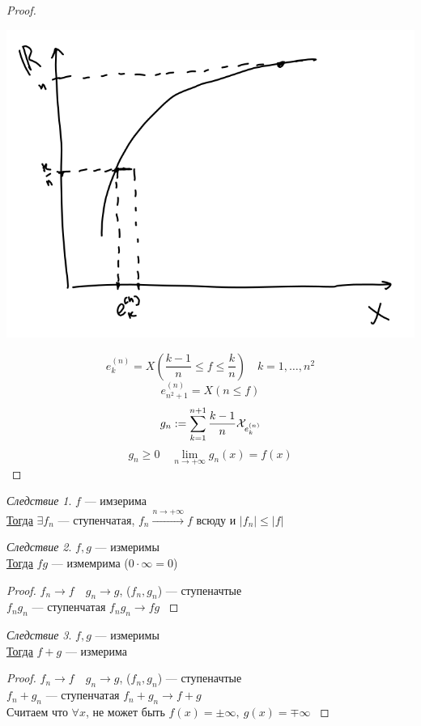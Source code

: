 \documentclass[english]{article}
\theoremstyle{plain}
\theoremstyle{remark}
\newtheorem{corollary}{Следствие}[theorem]
\theoremstyle{definition}
\begin{document}
\begin{proof}
\begin{center}
\includegraphics[scale=0.5]{2_1.png}
\end{center}
\[ e^{(n)}_k = X(\frac{k - 1}{n} \le f \le \frac{k}{n}) \quad k = 1,\dots,n^2 \]
\[ e^{(n)}_{n^2 + 1} = X(n \le f) \]
\[ g_n := \sum^{n + 1}_{k = 1} \frac{k - 1}{n} \mathcal{X}_{e^{(n)}_k} \]
\[ g_n \ge 0 \quad \lim_{n \to + \infty}g_n(x) = f(x) \]
\label{orgae76881}
\end{proof}
\begin{corollary}
\(f\) --- имзерима \\
\uline{Тогда} \(\exists f_n\) --- ступенчатая, \(f_n \xrightarrow{n \to + \infty}{} f\) всюду и \(|f_n| \le |f|\)
\label{org34e4768}
\end{corollary}
\begin{corollary}
\(f, g\) --- измеримы \\
\uline{Тогда} \(fg\) --- измемрима (\(0\cdot\infty=0\))
\label{orgf174c61}
\end{corollary}
\begin{proof}
\(f_n \to f\quad g_n \to g\), (\(f_n, g_n\)) --- ступеначтые \\
\(f_ng_n\) --- ступенчатая \(f_ng_n \to fg\)
\label{org5206326}
\end{proof}
\begin{corollary}
\(f, g\) --- измеримы \\
\uline{Тогда} \(f + g\) --- измерима
\label{org2df9d6e}
\end{corollary}
\begin{proof}
\(f_n \to f\quad g_n \to g\), (\(f_n, g_n\)) --- ступеначтые \\
\(f_n + g_n\) --- ступенчатая \(f_n + g_n \to f + g\) \\
\color{gray}Считаем что \(\forall x\), не может быть \(f(x) = \pm \infty,\ g(x) = \mp \infty\)
\label{org7597fe3}
\end{proof}
\end{document}
